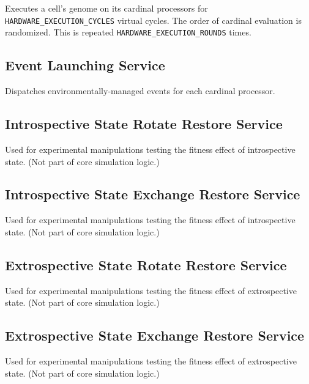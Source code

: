Executes a cell's genome on its cardinal processors for \texttt{HARDWARE\_EXECUTION\_CYCLES} virtual cycles.
The order of cardinal evaluation is randomized.
This is repeated \texttt{HARDWARE\_EXECUTION\_ROUNDS} times.

\subsection{Event Launching Service}


Dispatches environmentally-managed events for each cardinal processor.

\subsection{Introspective State Rotate Restore Service}


Used for experimental manipulations testing the fitness effect of introspective state.
(Not part of core simulation logic.)

\subsection{Introspective State Exchange Restore Service}


Used for experimental manipulations testing the fitness effect of introspective state.
(Not part of core simulation logic.)

\subsection{Extrospective State Rotate Restore Service}


Used for experimental manipulations testing the fitness effect of extrospective state.
(Not part of core simulation logic.)

\subsection{Extrospective State Exchange Restore Service}


Used for experimental manipulations testing the fitness effect of extrospective state.
(Not part of core simulation logic.)

